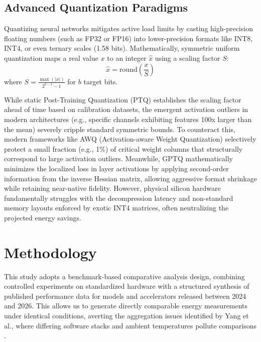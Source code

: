 \documentclass[12pt, a4paper]{report}
\begin{document}
\section{Advanced Quantization Paradigms}
Quantizing neural networks mitigates active load limits by casting high-precision floating numbers (such as FP32 or FP16) into lower-precision formats like INT8, INT4, or even ternary scales (1.58 bits). Mathematically, symmetric uniform quantization maps a real value $x$ to an integer $\hat{x}$ using a scaling factor $S$:
\begin{equation}
    \hat{x} = \text{round}\left( \frac{x}{S} \right)
\end{equation}
where $S = \frac{\max(|x|)}{2^{b-1} - 1}$ for $b$ target bits. 

While static Post-Training Quantization (PTQ) establishes the scaling factor ahead of time based on calibration datasets, the emergent activation outliers in modern architectures (e.g., specific channels exhibiting features 100x larger than the mean) severely cripple standard symmetric bounds. To counteract this, modern frameworks like AWQ (Activation-aware Weight Quantization) selectively protect a small fraction (e.g., 1\%) of critical weight columns that structurally correspond to large activation outliers. Meanwhile, GPTQ mathematically minimizes the localized loss in layer activations by applying second-order information from the inverse Hessian matrix, allowing aggressive format shrinkage while retaining near-native fidelity. However, physical silicon hardware fundamentally struggles with the decompression latency and non-standard memory layouts enforced by exotic INT4 matrices, often neutralizing the projected energy savings.

\chapter{Methodology}
\label{ch:methodology}

This study adopts a benchmark-based comparative analysis design, combining controlled experiments on standardized hardware with a structured synthesis of published performance data for models and accelerators released between 2024 and 2026. This allows us to generate directly comparable energy measurements under identical conditions, averting the aggregation issues identified by Yang et al., where differing software stacks and ambient temperatures pollute comparisons \cite{yang2025system}.
\end{document}
